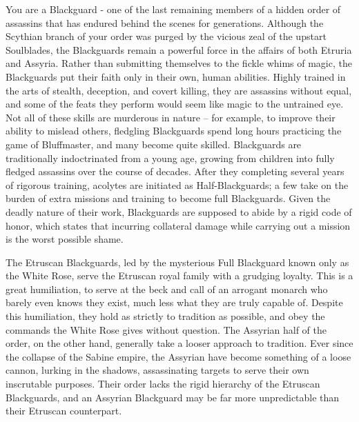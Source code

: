 \documentclass[blue]{Kos}
\begin{document}
\name{\bBlackguards{}}

You are a Blackguard - one of the last remaining members of a hidden order of assassins that has endured behind the scenes for generations. Although the Scythian branch of your order was purged by the vicious zeal of the upstart Soulblades, the Blackguards remain a powerful force in the affairs of both Etruria and Assyria. Rather than submitting themselves to the fickle whims of magic, the Blackguards put their faith only in their own, human abilities. Highly trained in the arts of stealth, deception, and covert killing, they are assassins without equal, and some of the feats they perform would seem like magic to the untrained eye. Not all of these skills are murderous in nature – for example, to improve their ability to mislead others, fledgling Blackguards spend long hours practicing the game of Bluffmaster, and many become quite skilled. Blackguards are traditionally indoctrinated from a young age, growing from children into fully fledged assassins over the course of decades. After they completing several years of rigorous training, acolytes are initiated as Half-Blackguards; a few take on the burden of extra missions and training to become full Blackguards. Given the deadly nature of their work, Blackguards are supposed to abide by a rigid code of honor, which states that incurring  collateral damage  while carrying out a mission is the worst possible shame. 

The Etruscan Blackguards, led by the mysterious Full Blackguard known only as the White Rose, serve the Etruscan royal family with a grudging loyalty. This is a great humiliation, to serve at the beck and call of an arrogant monarch who barely even knows they exist, much less what they are truly capable of. Despite this humiliation, they hold as strictly to tradition as possible, and obey the commands the White Rose gives without question. The Assyrian half of the order, on the other hand, generally take a looser approach to tradition. Ever since the collapse of the Sabine empire, the Assyrian have become something of a loose cannon, lurking in the shadows, assassinating targets to serve their own inscrutable purposes. Their order lacks the rigid hierarchy of the Etruscan Blackguards, and an Assyrian Blackguard may be far more unpredictable than their Etruscan counterpart. 
\end{document}
